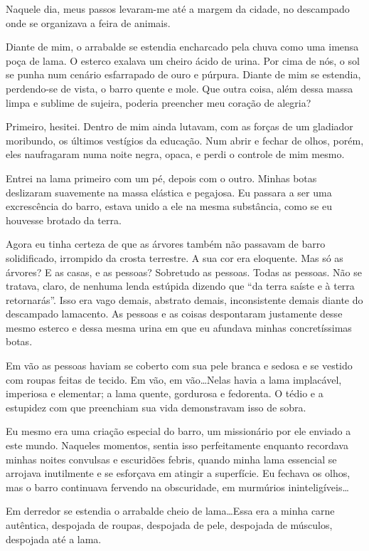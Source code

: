 Naquele dia, meus passos levaram-me até a margem da cidade, no descampado onde se organizava a feira de animais.

Diante de mim, o arrabalde se estendia encharcado pela chuva como uma imensa poça de lama. O esterco exalava um cheiro ácido de urina. Por cima de nós, o sol se punha num cenário esfarrapado de ouro e púrpura. Diante de mim se estendia, perdendo-se de vista, o barro quente e mole. Que outra coisa, além dessa massa limpa e sublime de sujeira, poderia preencher meu coração de alegria?

Primeiro, hesitei. Dentro de mim ainda lutavam, com as forças de um gladiador moribundo, os últimos vestígios da educação. Num abrir e fechar de olhos, porém, eles naufragaram numa noite negra, opaca, e perdi o controle de mim mesmo.

Entrei na lama primeiro com um pé, depois com o outro. Minhas botas deslizaram suavemente na massa elástica e pegajosa. Eu passara a ser uma excrescência do barro, estava unido a ele na mesma substância, como se eu houvesse brotado da terra.

Agora eu tinha certeza de que as árvores também não passavam de barro solidificado, irrompido da crosta terrestre. A sua cor era eloquente. Mas só as árvores? E as casas, e as pessoas? Sobretudo as pessoas. Todas as pessoas. Não se tratava, claro, de nenhuma lenda estúpida dizendo que ``da terra saíste e à terra retornarás''. Isso era vago demais, abstrato demais, inconsistente demais diante do descampado lamacento. As pessoas e as coisas despontaram justamente desse mesmo esterco e dessa mesma urina em que eu afundava minhas concretíssimas botas.

Em vão as pessoas haviam se coberto com sua pele branca e sedosa e se vestido com roupas feitas de tecido. Em vão, em vão\dots Nelas havia a lama implacável, imperiosa e elementar; a lama quente, gordurosa e fedorenta. O tédio e a estupidez com que preenchiam sua vida demonstravam isso de sobra.

Eu mesmo era uma criação especial do barro, um missionário por ele enviado a este mundo. Naqueles momentos, sentia isso perfeitamente enquanto recordava minhas noites convulsas e escuridões febris, quando minha lama essencial se arrojava inutilmente e se esforçava em atingir a superfície. Eu fechava os olhos, mas o barro continuava fervendo na obscuridade, em murmúrios ininteligíveis\dots

Em derredor se estendia o arrabalde cheio de lama\dots Essa era a minha carne autêntica, despojada de roupas, despojada de pele, despojada de músculos, despojada até a lama.

